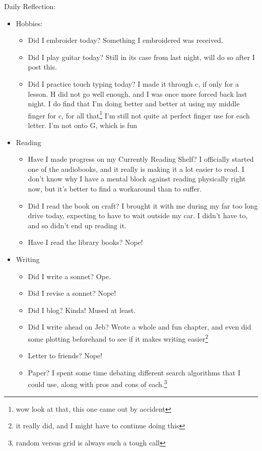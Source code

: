 \documentclass[12pt]{article}[titlepage]
\newcommand{\1}{\={a}}
\newcommand{\2}{\={e}}
\newcommand{\3}{\={\i}}
\newcommand{\4}{\=o}
\newcommand{\5}{\=u}
\newcommand{\6}{\={A}}
\renewcommand{\,}{\textsuperscript{,}}
\begin{document}
Daily Reflection:
\begin{itemize}
\item Hobbies:
\begin{itemize}
\item Did I embroider today? Something I embroidered was received.
\item Did I play guitar today? Still in its case from last night, will do so after I post this.
\item Did I practice touch typing today? I made it through c, if only for a lesson. H did not go well enough, and I was once more forced back last night. I do find that I'm doing better and better at using my middle finger for c, for all that\footnote{wow look at that, this one came out by accident} I'm still not quite at perfect finger use for each letter. I'm not onto G, which is fun
\end{itemize}
\item Reading
\begin{itemize}
\item Have I made progress on my Currently Reading Shelf? I officially started one of the audiobooks, and it really is making it a lot easier to read. I don't know why I have a mental block against reading physically right now, but it's better to find a workaround than to suffer.
\item Did I read the book on craft? I brought it with me during my far too long drive today, expecting to have to wait outside my car.
I didn't have to, and so didn't end up reading it.
\item Have I read the library books? Nope!
\end{itemize}
\item Writing
\begin{itemize}
\item Did I write a sonnet? Ope.
\item Did I revise a sonnet? Nope!
\item Did I blog? Kinda! Mused at least.
\item Did I write ahead on Jeb? Wrote a whole and fun chapter, and even did some plotting beforehand to see if it makes writing easier\footnote{it really did, and I might have to continue doing this}
\item Letter to friends? Nope!
\item Paper? I spent some time debating different search algorithms that I could use, along with pros and cons of each.\footnote{random versus grid is always such a tough call}
\end{itemize}

\end{itemize}
\end{document}
